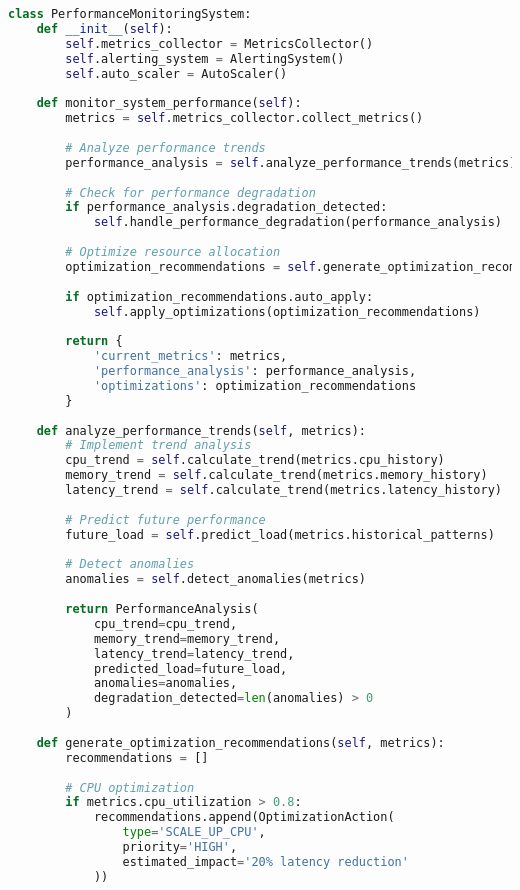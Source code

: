 \begin{lstlisting}[language=Python, caption={Performance Monitoring System}, label={lst:performance-monitoring}]
class PerformanceMonitoringSystem:
    def __init__(self):
        self.metrics_collector = MetricsCollector()
        self.alerting_system = AlertingSystem()
        self.auto_scaler = AutoScaler()
        
    def monitor_system_performance(self):
        metrics = self.metrics_collector.collect_metrics()
        
        # Analyze performance trends
        performance_analysis = self.analyze_performance_trends(metrics)
        
        # Check for performance degradation
        if performance_analysis.degradation_detected:
            self.handle_performance_degradation(performance_analysis)
        
        # Optimize resource allocation
        optimization_recommendations = self.generate_optimization_recommendations(metrics)
        
        if optimization_recommendations.auto_apply:
            self.apply_optimizations(optimization_recommendations)
        
        return {
            'current_metrics': metrics,
            'performance_analysis': performance_analysis,
            'optimizations': optimization_recommendations
        }
    
    def analyze_performance_trends(self, metrics):
        # Implement trend analysis
        cpu_trend = self.calculate_trend(metrics.cpu_history)
        memory_trend = self.calculate_trend(metrics.memory_history)
        latency_trend = self.calculate_trend(metrics.latency_history)
        
        # Predict future performance
        future_load = self.predict_load(metrics.historical_patterns)
        
        # Detect anomalies
        anomalies = self.detect_anomalies(metrics)
        
        return PerformanceAnalysis(
            cpu_trend=cpu_trend,
            memory_trend=memory_trend,
            latency_trend=latency_trend,
            predicted_load=future_load,
            anomalies=anomalies,
            degradation_detected=len(anomalies) > 0
        )
    
    def generate_optimization_recommendations(self, metrics):
        recommendations = []
        
        # CPU optimization
        if metrics.cpu_utilization > 0.8:
            recommendations.append(OptimizationAction(
                type='SCALE_UP_CPU',
                priority='HIGH',
                estimated_impact='20% latency reduction'
            ))
        

\end{lstlisting}
